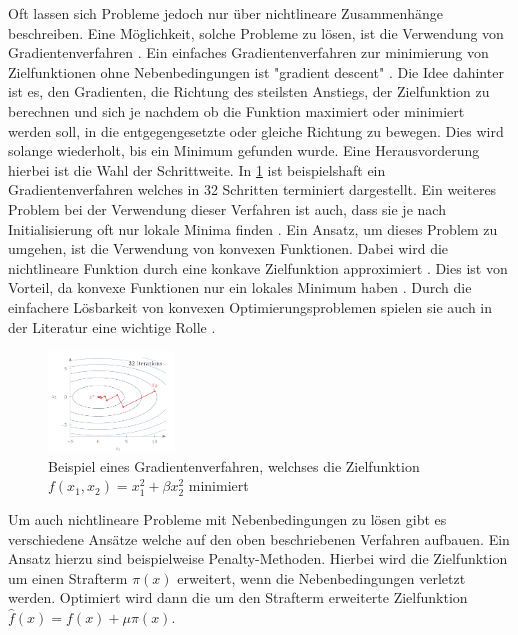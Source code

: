 Oft lassen sich Probleme jedoch nur über nichtlineare Zusammenhänge beschreiben.
Eine Möglichkeit, solche Probleme zu lösen, ist die Verwendung von
Gradientenverfahren \cite[153]{marti21bo}. Ein einfaches Gradientenverfahren zur
minimierung von Zielfunktionen ohne Nebenbedingungen ist "gradient descent"
\cite[110]{marti21bo}. Die Idee dahinter ist es, den Gradienten, die Richtung
des steilsten Anstiegs, der Zielfunktion zu berechnen und sich je nachdem ob die
Funktion maximiert oder minimiert werden soll, in die entgegengesetzte oder
gleiche Richtung zu bewegen. Dies wird solange wiederholt, bis ein Minimum
gefunden wurde. Eine Herausvorderung hierbei ist die Wahl der Schrittweite. In
\ref*{fig:gradient} ist beispielshaft ein Gradientenverfahren welches in 32
Schritten terminiert dargestellt. Ein weiteres Problem bei der Verwendung dieser
Verfahren ist auch, dass sie je nach Initialisierung oft nur lokale Minima
finden \cite[9]{boyd04bo}. Ein Ansatz, um dieses Problem zu umgehen, ist die
Verwendung von konvexen Funktionen. Dabei wird die nichtlineare Funktion durch
eine konkave Zielfunktion approximiert \cite[11]{boyd04bo}. Dies ist von
Vorteil, da konvexe Funktionen nur ein lokales Minimum haben
\cite[7]{noced06bo}. Durch die einfachere Lösbarkeit von konvexen
Optimierungsproblemen spielen sie auch in der Literatur eine wichtige Rolle
\cite[8]{boyd04bo}.

\begin{figure}[h]
    \centering
    \includegraphics[width=0.3\textwidth]{figures/[marti21bo Gradient].png}
    \caption{Beispiel eines Gradientenverfahren, welchses die Zielfunktion \\
    $f(x_1,x_2)=x_1^2+\beta x_2^2$ minimiert  \cite[112]{marti21bo}}
    \label{fig:gradient}
\end{figure}

Um auch nichtlineare Probleme mit Nebenbedingungen zu lösen gibt es verschiedene
Ansätze welche auf den oben beschriebenen Verfahren aufbauen. Ein Ansatz hierzu
sind beispielweise Penalty-Methoden. Hierbei wird die Zielfunktion um einen
Strafterm $\pi(x)$ erweitert, wenn die Nebenbedingungen verletzt werden.
Optimiert wird dann die um den Strafterm erweiterte Zielfunktion
$\hat{f}(x)=f(x)+\mu\pi(x)$.
\cite[175]{marti21bo}



